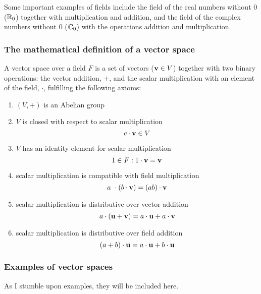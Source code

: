         Some important examples of fields include the field of the real numbers without $0$ ($\mathbb{R}_0$) together with multiplication and addition, and the field of the complex numbers without $0$ ($\mathbb{C}_0$) with the operations addition and multiplication. \\

    \subsubsection{The mathematical definition of a vector space}
        A vector space over a field $F$ is a set of vectors ($\vb{v} \in V$) together with two binary operations: the vector addition, $+$, and the scalar multiplication with an element of the field, $\cdot$, fulfilling the following axioms:
            \begin{enumerate}
                \item $(V,+)$ is an Abelian group

                \item $V$ is closed with respect to scalar multiplication
                \begin{equation}
                    c \cdot \vb{v} \in V
                \end{equation}

                \item $V$ has an identity element for scalar multiplication
                \begin{equation}
                    1 \in F: 1 \cdot \vb{v} = \vb{v}
                \end{equation}

                \item scalar multiplication is compatible with field multiplication
                \begin{equation}
                    a \cdot (b \cdot \vb{v}) = (ab) \cdot \vb{v}
                \end{equation}

                \item scalar multiplication is distributive over vector addition
                \begin{equation}
                    a \cdot (\vb{u} + \vb{v}) = a \cdot \vb{u} + a \cdot \vb{v}
                \end{equation}

                \item scalar multiplication is distributive over field addition
                \begin{equation}
                    (a + b) \cdot \vb{u} = a \cdot \vb{u} + b \cdot \vb{u}
                \end{equation}
            \end{enumerate}

    \subsubsection{Examples of vector spaces}
        As I stumble upon examples, they will be included here.
